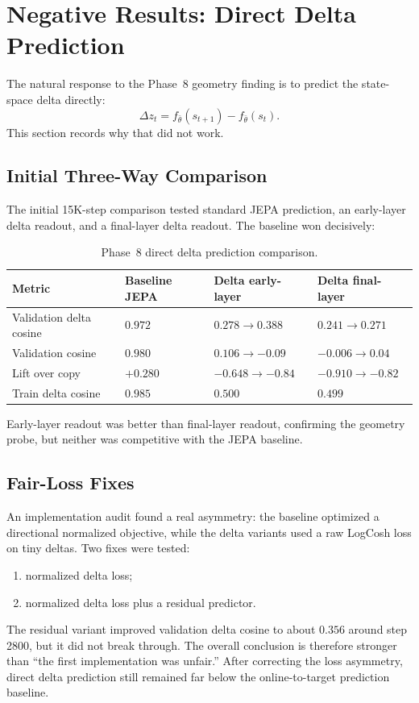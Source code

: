 \section{Negative Results: Direct Delta Prediction}
\label{sec:negative_results}

The natural response to the Phase~8 geometry finding is to predict the
state-space delta directly:
\begin{equation}
    \Delta z_t = f_{\bar{\theta}}(s_{t+1})
               - f_{\bar{\theta}}(s_t).
    \label{eq:explicit_delta}
\end{equation}
This section records why that did not work.

\subsection{Initial Three-Way Comparison}

The initial 15K-step comparison tested standard JEPA prediction, an
early-layer delta readout, and a final-layer delta readout.  The baseline
won decisively:

\begin{table}[h]
\centering
\caption{Phase~8 direct delta prediction comparison.}
\label{tab:delta}
\smallskip
\begin{tabular}{llll}
\toprule
Metric & Baseline JEPA & Delta early-layer & Delta final-layer \\
\midrule
Validation delta cosine & $0.972$ & $0.278 \rightarrow 0.388$ & $0.241 \rightarrow 0.271$ \\
Validation cosine & $0.980$ & $0.106 \rightarrow -0.09$ & $-0.006 \rightarrow 0.04$ \\
Lift over copy & $+0.280$ & $-0.648 \rightarrow -0.84$ & $-0.910 \rightarrow -0.82$ \\
Train delta cosine & $0.985$ & $0.500$ & $0.499$ \\
\bottomrule
\end{tabular}
\end{table}

Early-layer readout was better than final-layer readout, confirming the
geometry probe, but neither was competitive with the JEPA baseline.

\subsection{Fair-Loss Fixes}

An implementation audit found a real asymmetry: the baseline optimized a
directional normalized objective, while the delta variants used a raw
LogCosh loss on tiny deltas.  Two fixes were tested:
\begin{enumerate}
    \item normalized delta loss;
    \item normalized delta loss plus a residual predictor.
\end{enumerate}
The residual variant improved validation delta cosine to about $0.356$
around step 2800, but it did not break through.  The overall conclusion
is therefore stronger than ``the first implementation was unfair.''
After correcting the loss asymmetry, direct delta prediction still
remained far below the online-to-target prediction baseline.

